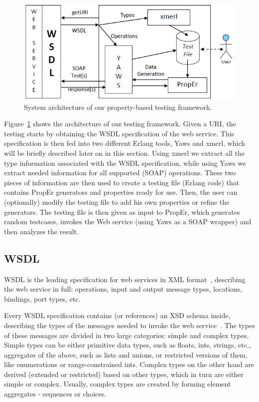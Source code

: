 \documentclass[submission,copyright,a4]{eptcs}
\begin{document}
\begin{figure}
\includegraphics{Framework.png}
\caption{System architecture of our property-based testing framework.}
\label{fig:architecture}
\end{figure}

Figure~\ref{fig:architecture} shows the architecture of our testing
framework. Given a URI, the testing starts by obtaining the WSDL
specification of the web service. This specification is then fed into
two different Erlang tools, Yaws and xmerl, which will be briefly
described later on in this section. Using xmerl we extract all the
type information associated with the WSDL specification, while using
Yaws we extract needed information for all supported (SOAP)
operations. These two pieces of information are then used to create a
testing file (Erlang code) that contains PropEr generators and
properties ready for use. Then, the user can (optionally) modify the
testing file to add his own properties or refine the generators. The
testing file is then given as input to PropEr, which generates random
testcases, invokes the Web service (using Yaws as a SOAP wrapper) and
then analyzes the result.

\subsection{WSDL}

WSDL is the leading specification for web services in XML
format~\cite{wsdl_spec}, describing the web service in full:
operations, input and output message types, locations, bindings, port
types, etc.

Every WSDL specification contains (or references) an XSD schema
inside, describing the types of the messages needed to invoke the web
service~\cite{xsd_structure_spec,xsd_datatypes_spec}. The types of
these messages are divided in two large categories: simple and complex
types. Simple types can be either primitive data types, such as
floats, ints, strings, etc., aggregates of the above, such as lists
and unions, or restricted versions of them, like enumerations or
range-constrained ints. Complex types on the other hand are derived
(extended or restricted) based on other types, which in turn are
either simple or complex. Usually, complex types are created by
forming element aggregates - sequences or choices.
\end{document}

